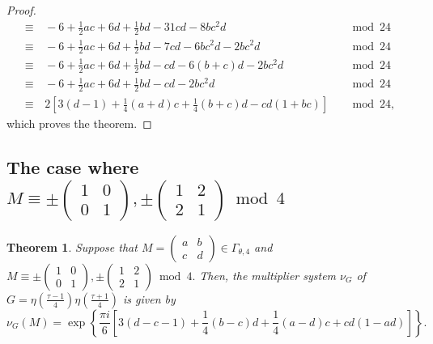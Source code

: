 \documentclass[12pt]{article}
\theoremstyle{definition}
\newtheorem{theorem}{Theorem}
\numberwithin{equation}{section}
\numberwithin{theorem}{section}
\begin{document}
\begin{proof}
\begin{align*}
\equiv & \,
-6+\frac12ac+6d+\frac12bd-31cd-8bc^2d
& &\bmod{24} \,  \\
\equiv &\, 
-6+\frac12ac+6d+\frac12bd-7cd-6bc^2d-2bc^2d &  &\bmod{24} \, \\
\equiv &
\, 
-6+\frac12ac+6d+\frac12bd-cd-6(b+c)d-2bc^2d
&  &\bmod{24}  \\
\equiv &\,
-6+\frac12ac+6d+\frac12bd-cd-2bc^2d  &  &\bmod{24} \,  \\
\equiv & \,
2
\left[
3(d-1)+\frac14(a+d)c+\frac14(b+c)d-cd(1+bc)
\right]    &  &\bmod{24},
\end{align*}
which proves the theorem. 
\end{proof}











\subsection{The case where 
$
M
\equiv \pm
\begin{pmatrix}
1 & 0 \\
0 & 1
\end{pmatrix}, 
\pm
 \begin{pmatrix}
1 & 2 \\
2 & 1
\end{pmatrix}
\bmod{4}
$ 
}




\begin{theorem}
\label{thm:M:c-even-level4}
{\it
Suppose that 
$
M=
\begin{pmatrix}
a & b \\
c & d
\end{pmatrix}
\in 
\Gamma_{\theta,4}
$ 
and 
$M\equiv 
 \pm
\begin{pmatrix}
1 & 0 \\
0 & 1
\end{pmatrix}, 
\pm
 \begin{pmatrix}
1 & 2 \\
2 & 1
\end{pmatrix}
\bmod{4}.
$ 
Then, 
the multiplier system 
$\nu_{G}$ of 
$
\displaystyle 
G=
\eta \left(\frac{\tau-1}{4} \right) \eta\left(\frac{\tau+1}{4} \right)
$ 
is given by 
\begin{equation*}
\nu_{G}
(M)
=
\exp
\left\{
\frac{\pi i}{6}
\left[
3(d-c-1)+\frac14(b-c)d
+\frac14(a-d)c+cd(1-ad)
\right]
\right\}. 
\end{equation*}
}
\end{theorem}
\end{document}
